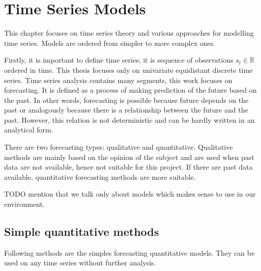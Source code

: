 \chapter{Time Series Models}
This chapter focuses on time series theory and various approaches for modelling time series.
Models are ordered from simpler to more complex ones. 

Firstly, it is important to define time series; it is sequence of observations
$s_t \in \mathbb{R}$ ordered in time. This thesis focuses only on univariate equidistant 
discrete time series. Time series analysis contains many segments, this work focuses on 
forecasting. It is defined as a process of making prediction of the future based 
on the past. In other words, forecasting is possible because  
future depends on the past or analogously because there is a relationship
between the future and the past. However, this relation is not deterministic and 
can be hardly written in an analytical form.

There are two forecasting types: qualitative and quantitative.
Qualitative methods are mainly based on the opinion of the subject and are used 
when past data are not available, hence not suitable for this project. 
If there are past data available, quantitative forecasting methods are more suitable. 

TODO mention that we talk only about models which makes sense to use in our environment.

    \section{Simple quantitative methods}
    Following methods are the simples forecasting quantitative models. They can be used on
    any time series without further analysis. 

